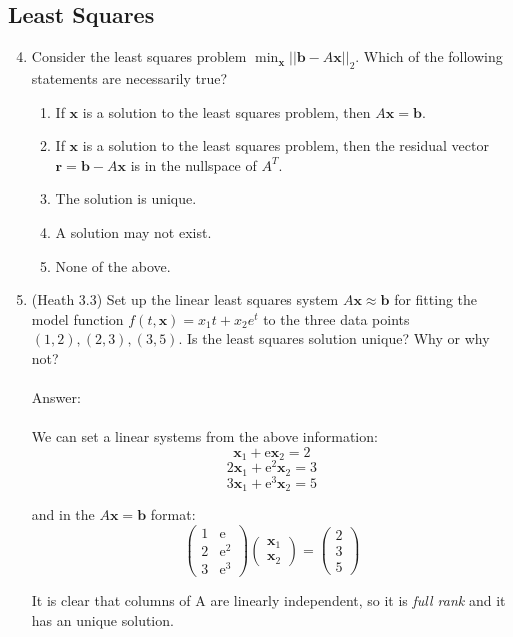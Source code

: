 \documentclass{article}
\renewcommand{\vec}[1]{\mathbf{#1}}
\newcommand{\x}{\vec{x}}
\renewcommand{\r}{\vec{r}}
\renewcommand{\b}{\vec{b}}
\newcommand{\me}{\mathrm{e}}
\begin{document}
\subsection*{Least Squares}
\begin{enumerate}
\setcounter{enumi}{3}

\item Consider the least squares problem $\min_\x ||\b - A\x||_2$.  Which of the following statements are
  necessarily true?
\begin{enumerate}
\item If $\x$ is a solution to the least squares problem, then $A\x = \b$.
\item If $\x$ is a solution to the least squares problem, then the residual vector $\r = \b - A \x$ is in the nullspace of $A^T$. \Large \checkmark \normalsize
\item The solution is unique.
\item A solution may not exist.
\item None of the above.
\end{enumerate}

\item (Heath 3.3) Set up the linear least squares system $A\vec{x} \approx \vec{b}$ for fitting the model function $f(t,\vec{x}) = x_1 t + x_2 e^t$ to the three data points $(1,2),
  (2,3), (3,5)$.  Is the least squares solution unique? Why or why not?\\
\\
Answer:\\
\\
We can set a linear systems from the above information:
$$\vec{x}_1+\me\vec{x}_2=2$$
$$2\vec{x}_1+\me^2\vec{x}_2=3$$
$$3\vec{x}_1+\me^3\vec{x}_2=5$$

and in the $A\x=\b$ format:
$$ \begin{pmatrix} 1 & \me \\ 2 & \me^2 \\ 3 & \me^3  \end{pmatrix} \begin{pmatrix} \x_1 \\ \x_2 \end{pmatrix} = \begin{pmatrix} 2 \\ 3 \\ 5 \end{pmatrix}$$

It is clear that columns of A are linearly independent, so it is \textit{full rank} and it has an unique solution.


\end{enumerate}
\end{document}
